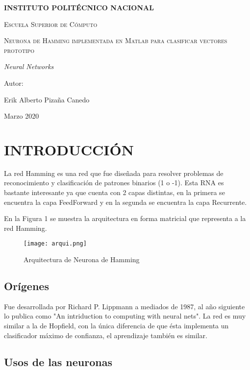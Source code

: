 \documentclass[]{article}
\begin{document}
	
	\begin{titlepage}
		\centering
		{\bfseries\LARGE INSTITUTO POLITÉCNICO NACIONAL \par}
		\vspace{1cm}
		{\scshape\Large Escuela Superior de Cómputo \par}
		\vspace{3cm}
		{\scshape\Huge Neurona de Hamming implementada en Matlab para clasificar vectores prototipo \par}
		\vspace{3cm}
		{\itshape\Large Neural Networks \par}
		\vfill
		{\Large Autor: \par}
		{\Large Erik Alberto Pizaña Canedo \par}
		\vfill
		{\Large Marzo 2020 \par}
	\end{titlepage}

	\section{INTRODUCCIÓN}
	La red Hamming es una red que fue diseñada para resolver problemas de reconocimiento y
	clasificación de patrones binarios (1 o -1). Esta RNA es bastante interesante ya que cuenta con 2
	capas distintas, en la primera se encuentra la capa FeedForward y en la segunda se encuentra la capa
	Recurrente.

	En la Figura 1 se muestra la arquitectura en forma matricial que representa a la red Hamming.
	
	\begin{figure}[h]
		\centering
		\texttt{[image: arqui.png]}
		\caption{Arquitectura de Neurona de Hamming}
	\end{figure}
	\subsection{Orígenes}
	Fue desarrollada por Richard P. Lippmann a mediados de 1987, al año siguiente lo publica como "An intriduction to computing with neural nets". La red es muy similar a la de Hopfield, con la única diferencia de que ésta implementa un clasificador máximo de confianza, el aprendizaje también es similar.
	
	\subsection{Usos de las neuronas}
	
\end{document}
